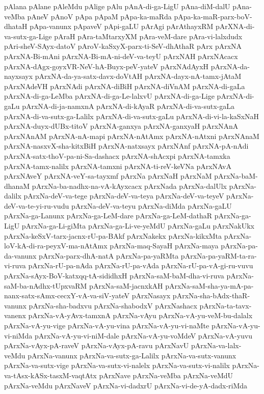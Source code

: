 {pAlana
pAlane
pAleMdu
pAlige
pAlu
pAnA-di-ga-LigU
pAna-diM-dalU
pAna-veMba
pAneV
pAnoV
pApa
pApaM
pApa-ka-maRda
pApa-ka-maR-parx-boV-dhataH
pApa-vanunx
pApaveV
pApi-gaLU
pArAgi
pArAthayxRM
pArXNA-di-va-sutx-ga-Lige
pAraH
pAra-taMtarxyXM
pAra-veM-dare
pAra-vi-lalxdudx
pAri-sheV-SAyx-datoV
pAroV-kaSxyX-parx-ti-SeV-dhAthaR
pArx
pArxNA
pArxNA-Bi-mAni
pArxNA-Bi-mA-ni-deV-va-teyU
pArxNAH
pArxNAcacx
pArxNA-dAgx-goyxVR-NeV-hA-Buyx-peV-yateV
pArxNAdAyxH
pArxNA-da-nayxsayx
pArxNA-da-ya-satx-davx-doVtAH
pArxNA-dayx-nA-tamx-jAtaM
pArxNAdeVH
pArxNAdi
pArxNA-diBiH
pArxNA-diVnAM
pArxNA-di-gaLa
pArxNA-di-ga-LeMba
pArxNA-di-ga-Le-lalxvU
pArxNA-di-ga-Lige
pArxNA-di-gaLu
pArxNA-di-ja-namxnA
pArxNA-di-kAyaR
pArxNA-di-va-sutx-gaLa
pArxNA-di-va-sutx-ga-Lalilx
pArxNA-di-va-sutx-gaLu
pArxNA-di-vi-la-kaSxNaH
pArxNA-duyx-dUBx-titoV
pArxNA-ganxya
pArxNA-ganxyaH
pArxNAnA
pArxNAnAM
pArxNA-nA-mapi
pArxNA-nAtAmx
pArxNA-nAtxni
pArxNAnaM
pArxNA-nasxvX-sha-kitxBiH
pArxNA-natxsayx
pArxNAnf
pArxNA-pA-nAdi
pArxNA-satx-thoV-pa-ni-Sa-dashacx
pArxNA-shAcxpi
pArxNA-tamxka
pArxNA-tamx-nalilx
pArxNA-tamxni
pArxNA-ti-reV-keVNa
pArxNAvA
pArxNAveY
pArxNA-veY-sa-tayxmf
pArxNa
pArxNaH
pArxNaM
pArxNa-baM-dhanaM
pArxNa-ba-nadhx-na-vA-kAyxcacx
pArxNada
pArxNa-dalUlx
pArxNa-dalilx
pArxNa-deV-va-tege
pArxNa-deV-va-teya
pArxNa-deV-va-teyeV
pArxNa-deV-va-te-yi-ru-vudu
pArxNa-deV-va-teyu
pArxNa-diMda
pArxNa-gaLU
pArxNa-ga-Lanunx
pArxNa-ga-LeM-dare
pArxNa-ga-LeM-dathaR
pArxNa-ga-LigU
pArxNa-ga-Li-giMta
pArxNa-ga-Li-ve-yeMdU
pArxNa-gaLu
pArxNakUkx
pArxNa-keSxV-tarx-jacnx-rU-pa-BAkf
pArxNakekx
pArxNa-kikxMta
pArxNa-loV-kA-di-ra-peyxV-ma-nAtAmx
pArxNa-maq-SayaH
pArxNa-maya
pArxNa-pa-da-vanunx
pArxNa-parx-dhA-natA
pArxNa-pa-yaRMta
pArxNa-pa-yaRM-ta-ra-vi-ruva
pArxNa-rU-pa-nAda
pArxNa-rU-pa-vAda
pArxNa-rU-pa-vA-gi-ru-vuvu
pArxNa-sAyx-BoV-katxqq-tA-sididhxH
pArxNa-saM-baM-dha-vi-ruva
pArxNa-saM-ba-nAdhx-tUpxvaRM
pArxNa-saM-jacnxkAH
pArxNa-saM-sha-ya-mA-pa-nanx-satx-sAmx-cecxY-vA-va-siV-yateV
pArxNasayx
pArxNa-sha-bAdx-thaR-vanunx
pArxNa-sha-badxvu
pArxNa-shabodxV
pArxNashacx
pArxNa-ta-tavx-vanenx
pArxNa-vA-yAvx-tamxnA
pArxNa-vAyu
pArxNa-vA-yu-veM-bu-dalalx
pArxNa-vA-yu-vige
pArxNa-vA-yu-vina
pArxNa-vA-yu-vi-naMte
pArxNa-vA-yu-vi-niMda
pArxNa-vA-yu-vi-niM-dale
pArxNa-vA-yu-voMdeV
pArxNa-vA-yuvu
pArxNa-vAyx-pA-raveV
pArxNa-vAyx-pA-ravu
pArxNavU
pArxNa-va-lalx-veMdu
pArxNa-vanunx
pArxNa-va-sutx-ga-Lalilx
pArxNa-va-sutx-vanunx
pArxNa-va-sutx-vige
pArxNa-va-sutx-vi-nalelx
pArxNa-va-sutx-vi-nalilx
pArxNa-va-tAsx-kASx-tasxM-vaqtAtx
pArxNave
pArxNa-veMba
pArxNa-veMdU
pArxNa-veMdu
pArxNaveV
pArxNa-vi-dadxrU
pArxNa-vi-de-yA-dadx-riMda
}
